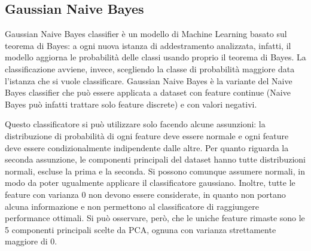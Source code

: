 \subsection{Gaussian Naive Bayes}
Gaussian Naive Bayes classifier è un modello di Machine Learning basato sul
teorema di Bayes: a ogni nuova istanza di addestramento analizzata, infatti,
il modello aggiorna le probabilità delle classi usando proprio il teorema di Bayes.
La classificazione avviene, invece, scegliendo la classe di probabilità maggiore
data l'istanza che si vuole classificare.
Gaussian Naive Bayes è la variante del Naive Bayes classifier che può essere applicata
a dataset con feature continue (Naive Bayes può infatti trattare solo feature 
discrete) e con valori negativi.

Questo classificatore si può utilizzare solo facendo alcune
assunzioni: la distribuzione di probabilità di ogni feature deve essere
normale e ogni feature deve essere condizionalmente indipendente dalle altre.
Per quanto riguarda la seconda assunzione, le componenti principali del dataset
hanno tutte distribuzioni normali, escluse la prima e la seconda. 
Si possono comunque assumere normali, in modo da poter ugualmente applicare il 
classificatore gaussiano.
Inoltre, tutte le feature con varianza 0 non devono essere considerate, in quanto
non portano alcuna informazione e non permettono al classificatore di 
raggiungere performance ottimali. Si può osservare, però, che le uniche feature
rimaste sono le 5 componenti principali scelte da PCA, ognuna con varianza
strettamente maggiore di 0.

